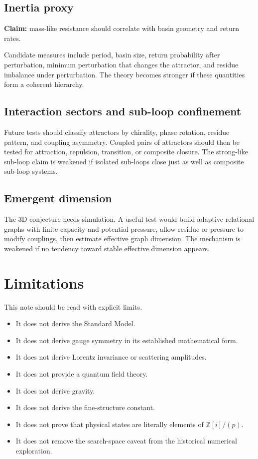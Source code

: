 \documentclass[11pt,a4paper]{article}
\newcommand{\ZGi}{\mathbb{Z}[i]}
\newcommand{\modp}{\ZGi/(p)}
\begin{document}
\subsection{Inertia proxy}

\textbf{Claim:} mass-like resistance should correlate with basin geometry and
return rates.

Candidate measures include period, basin size, return probability after
perturbation, minimum perturbation that changes the attractor, and residue
imbalance under perturbation. The theory becomes stronger if these quantities
form a coherent hierarchy.

\subsection{Interaction sectors and sub-loop confinement}

Future tests should classify attractors by chirality, phase rotation, residue
pattern, and coupling asymmetry. Coupled pairs of attractors should then be
tested for attraction, repulsion, transition, or composite closure. The
strong-like sub-loop claim is weakened if isolated sub-loops close just as
well as composite sub-loop systems.

\subsection{Emergent dimension}

The 3D conjecture needs simulation. A useful test would build adaptive
relational graphs with finite capacity and potential pressure, allow residue
or pressure to modify couplings, then estimate effective graph dimension. The
mechanism is weakened if no tendency toward stable effective dimension appears.

\section{Limitations}

This note should be read with explicit limits.

\begin{itemize}
\item It does not derive the Standard Model.
\item It does not derive gauge symmetry in its established mathematical form.
\item It does not derive Lorentz invariance or scattering amplitudes.
\item It does not provide a quantum field theory.
\item It does not derive gravity.
\item It does not derive the fine-structure constant.
\item It does not prove that physical states are literally elements of
$\modp$.
\item It does not remove the search-space caveat from the historical numerical
exploration.
\end{itemize}
\end{document}
